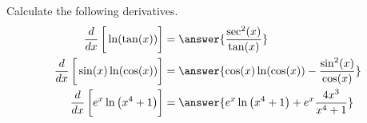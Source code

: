 \documentclass{ximera}
\author{Nela Lakos \and Kyle Parsons}
\begin{document}
\begin{exercise}

Calculate the following derivatives.
\begin{align*}
\ddx\left[\vphantom{\ddx}\ln(\tan(x))\right] &= \answer{\frac{\sec^2(x)}{\tan(x)}}\\
\ddx\left[\vphantom{\ddx}\sin(x)\ln(\cos(x))\right] &= \answer{\cos(x)\ln(\cos(x)) - \frac{\sin^2(x)}{\cos(x)}}\\
\ddx\left[\vphantom{\ddx}e^x\ln\left(x^4+1\right)\right] &= \answer{e^x\ln\left(x^4+1\right) + e^x\frac{4x^3}{x^4+1}}
\end{align*}

\end{exercise}
\end{document}
